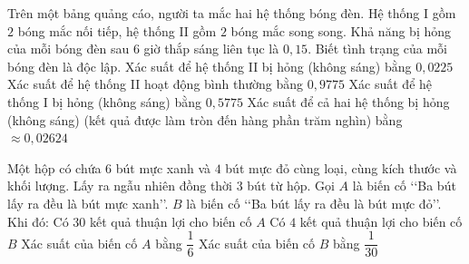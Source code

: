 \begin{ex}%
	Trên một bảng quảng cáo, người ta mắc hai hệ thống bóng đèn. Hệ thống I gồm $2$ bóng mắc nối tiếp, hệ thống II gồm $2$ bóng mắc song song. Khả năng bị hỏng của mỗi bóng đèn sau $6$ giờ thắp sáng liên tục là $0{,}15$. Biết tình trạng của mỗi bóng đèn là độc lập. 
	\choiceTF
		{\True Xác suất để hệ thống II bị hỏng (không sáng) bằng $0{,}0225$}
		{\True Xác suất để hệ thống II hoạt động bình thường bằng $0{,}9775$}
		{Xác suất để hệ thống I bị hỏng (không sáng) bằng $0{,}5775$}
		{Xác suất để cả hai hệ thống bị hỏng (không sáng) (kết quả được làm tròn đến hàng phần trăm nghìn) bằng $\approx 0{,}02624$}
\end{ex}
\begin{ex}%
	Một hộp có chứa $6$ bút mực xanh và $4$ bút mực đỏ cùng loại, cùng kích thước và khối lượng. Lấy ra ngẫu nhiên đồng thời $3$ bút từ hộp. Gọi $A$ là biến cố \lq\lq Ba bút lấy ra đều là bút mực xanh\rq\rq. $B$ là biến cố \lq\lq Ba bút lấy ra đều là bút mực đỏ\rq\rq. Khi đó:
	\choiceTF
		{Có $30$ kết quả thuận lợi cho biến cố $A$}
		{\True Có $4$ kết quả thuận lợi cho biến cố $B$}
		{\True Xác suất của biến cố $A$ bằng $\dfrac{1}{6}$}
		{\True Xác suất của biến cố $B$ bằng $\dfrac{1}{30}$}
\end{ex}
